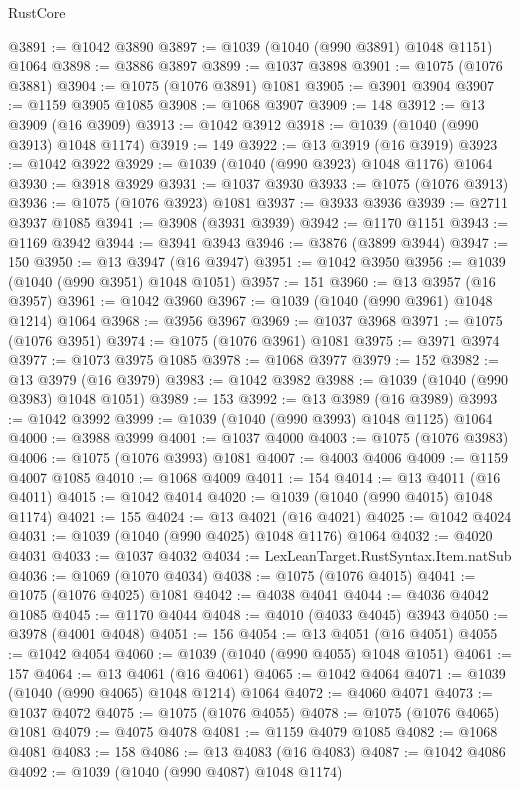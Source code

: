 \begin{lexlean}{RustCore}
\begin{coremodule}
@3891 := @1042 @3890
@3897 := @1039 (@1040 (@990 @3891) @1048 @1151) @1064
@3898 := @3886 @3897
@3899 := @1037 @3898
@3901 := @1075 (@1076 @3881)
@3904 := @1075 (@1076 @3891) @1081
@3905 := @3901 @3904
@3907 := @1159 @3905 @1085
@3908 := @1068 @3907
@3909 := 148
@3912 := @13 @3909 (@16 @3909)
@3913 := @1042 @3912
@3918 := @1039 (@1040 (@990 @3913) @1048 @1174)
@3919 := 149
@3922 := @13 @3919 (@16 @3919)
@3923 := @1042 @3922
@3929 := @1039 (@1040 (@990 @3923) @1048 @1176) @1064
@3930 := @3918 @3929
@3931 := @1037 @3930
@3933 := @1075 (@1076 @3913)
@3936 := @1075 (@1076 @3923) @1081
@3937 := @3933 @3936
@3939 := @2711 @3937 @1085
@3941 := @3908 (@3931 @3939)
@3942 := @1170 @1151
@3943 := @1169 @3942
@3944 := @3941 @3943
@3946 := @3876 (@3899 @3944)
@3947 := 150
@3950 := @13 @3947 (@16 @3947)
@3951 := @1042 @3950
@3956 := @1039 (@1040 (@990 @3951) @1048 @1051)
@3957 := 151
@3960 := @13 @3957 (@16 @3957)
@3961 := @1042 @3960
@3967 := @1039 (@1040 (@990 @3961) @1048 @1214) @1064
@3968 := @3956 @3967
@3969 := @1037 @3968
@3971 := @1075 (@1076 @3951)
@3974 := @1075 (@1076 @3961) @1081
@3975 := @3971 @3974
@3977 := @1073 @3975 @1085
@3978 := @1068 @3977
@3979 := 152
@3982 := @13 @3979 (@16 @3979)
@3983 := @1042 @3982
@3988 := @1039 (@1040 (@990 @3983) @1048 @1051)
@3989 := 153
@3992 := @13 @3989 (@16 @3989)
@3993 := @1042 @3992
@3999 := @1039 (@1040 (@990 @3993) @1048 @1125) @1064
@4000 := @3988 @3999
@4001 := @1037 @4000
@4003 := @1075 (@1076 @3983)
@4006 := @1075 (@1076 @3993) @1081
@4007 := @4003 @4006
@4009 := @1159 @4007 @1085
@4010 := @1068 @4009
@4011 := 154
@4014 := @13 @4011 (@16 @4011)
@4015 := @1042 @4014
@4020 := @1039 (@1040 (@990 @4015) @1048 @1174)
@4021 := 155
@4024 := @13 @4021 (@16 @4021)
@4025 := @1042 @4024
@4031 := @1039 (@1040 (@990 @4025) @1048 @1176) @1064
@4032 := @4020 @4031
@4033 := @1037 @4032
@4034 := LexLeanTarget.RustSyntax.Item.natSub
@4036 := @1069 (@1070 @4034)
@4038 := @1075 (@1076 @4015)
@4041 := @1075 (@1076 @4025) @1081
@4042 := @4038 @4041
@4044 := @4036 @4042 @1085
@4045 := @1170 @4044
@4048 := @4010 (@4033 @4045) @3943
@4050 := @3978 (@4001 @4048)
@4051 := 156
@4054 := @13 @4051 (@16 @4051)
@4055 := @1042 @4054
@4060 := @1039 (@1040 (@990 @4055) @1048 @1051)
@4061 := 157
@4064 := @13 @4061 (@16 @4061)
@4065 := @1042 @4064
@4071 := @1039 (@1040 (@990 @4065) @1048 @1214) @1064
@4072 := @4060 @4071
@4073 := @1037 @4072
@4075 := @1075 (@1076 @4055)
@4078 := @1075 (@1076 @4065) @1081
@4079 := @4075 @4078
@4081 := @1159 @4079 @1085
@4082 := @1068 @4081
@4083 := 158
@4086 := @13 @4083 (@16 @4083)
@4087 := @1042 @4086
@4092 := @1039 (@1040 (@990 @4087) @1048 @1174)

\end{coremodule}
\end{lexlean}
